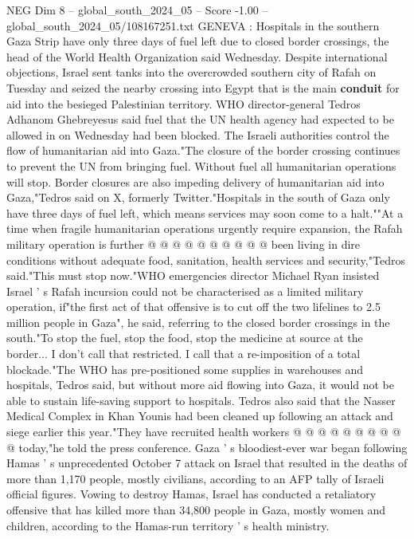 \begin{textsample}{NEG Dim 8 – global\_south\_2024\_05 – Score -1.00 – global\_south\_2024\_05/108167251.txt}  \label{ex:f8_neg_103}
GENEVA : Hospitals in the southern Gaza Strip have only three days of fuel left due to closed border crossings, the head of the World Health Organization said Wednesday.
Despite international objections, Israel sent tanks into the overcrowded southern city of Rafah on Tuesday and seized the nearby crossing into Egypt that is the main \textbf{conduit} for aid into the besieged Palestinian territory.
WHO director-general Tedros Adhanom Ghebreyesus said fuel that the UN health agency had expected to be allowed in on Wednesday had been blocked.
The Israeli authorities control the flow of humanitarian aid into Gaza."The closure of the border crossing continues to prevent the UN from bringing fuel.
Without fuel all humanitarian operations will stop.
Border closures are also impeding delivery of humanitarian aid into Gaza,"Tedros said on X, formerly Twitter."Hospitals in the south of Gaza only have three days of fuel left, which means services may soon come to a halt.""At a time when fragile humanitarian operations urgently require expansion, the Rafah military operation is further @ @ @ @ @ @ @ @ @ @ been living in dire conditions without adequate food, sanitation, health services and security,"Tedros said."This must stop now."WHO emergencies director Michael Ryan insisted Israel ' s Rafah incursion could not be characterised as a limited military operation, if"the first act of that offensive is to cut off the two lifelines to 2.5 million people in Gaza", he said, referring to the closed border crossings in the south."To stop the fuel, stop the food, stop the medicine at source at the border...
I don't call that restricted.
I call that a re-imposition of a total blockade."The WHO has pre-positioned some supplies in warehouses and hospitals, Tedros said, but without more aid flowing into Gaza, it would not be able to sustain life-saving support to hospitals.
Tedros also said that the Nasser Medical Complex in Khan Younis had been cleaned up following an attack and siege earlier this year."They have recruited health workers @ @ @ @ @ @ @ @ @ @ today,"he told the press conference.
Gaza ' s bloodiest-ever war began following Hamas ' s unprecedented October 7 attack on Israel that resulted in the deaths of more than 1,170 people, mostly civilians, according to an AFP tally of Israeli official figures.
Vowing to destroy Hamas, Israel has conducted a retaliatory offensive that has killed more than 34,800 people in Gaza, mostly women and children, according to the Hamas-run territory ' s health ministry.

\end{textsample}
